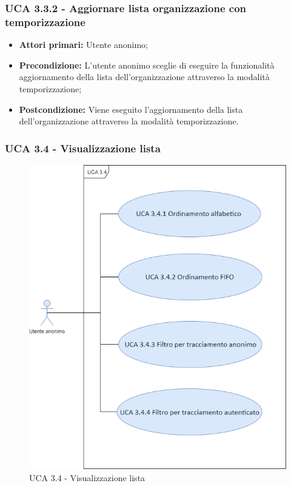 \subsubsection{UCA 3.3.2 - Aggiornare lista organizzazione con temporizzazione}%
\begin{itemize} 
	\item \textbf{Attori primari:} Utente anonimo;
	\item \textbf{Precondizione:} L'utente anonimo sceglie di eseguire la funzionalità aggiornamento della lista dell'organizzazione attraverso la modalità temporizzazione; 	
	\item \textbf{Postcondizione:} Viene eseguito l'aggiornamento della lista dell'organizzazione attraverso la modalità temporizzazione.
\end{itemize}

\newpage


\subsubsection{UCA 3.4 - Visualizzazione lista}%

\begin{figure}[h]
	\centering	
	\includegraphics[scale=0.5]{sezioni/UseCase/Immagini/UCA3.4.png}
	\caption{UCA 3.4 - Visualizzazione lista}
\end{figure}

